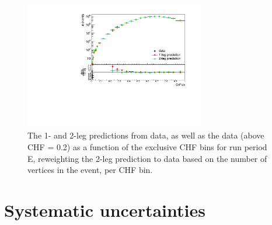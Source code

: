 \begin{figure}[ht]
  \centering
  \includegraphics[width=0.7\textwidth]{figures/data_vs_prediction_RunE_reweighted_exclusivebinning.pdf}\hfill%
  \caption{The 1- and 2-leg predictions from data, as well as the data (above CHF = 0.2) as a function of the exclusive CHF bins for run period E, reweighting the 2-leg prediction to data based on the number of vertices in the event, per CHF bin.}
  \label{fig:BF_reweighted}
\end{figure}

\section{Systematic uncertainties}
\label{sec:SIMP_systematics}

